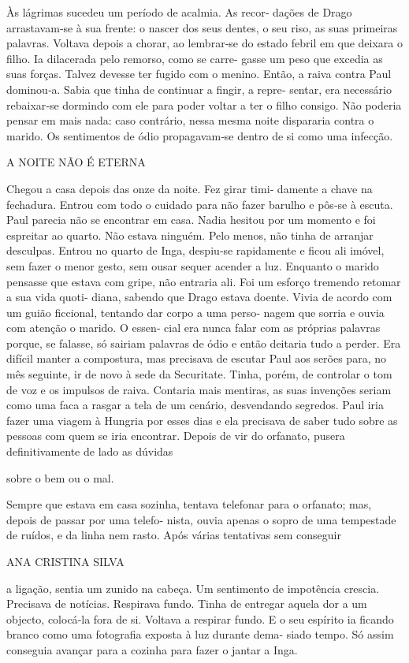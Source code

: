 Às lágrimas sucedeu um período de acalmia. As recor‑ dações de Drago
arrastavam‑se à sua frente: o nascer dos seus dentes, o seu riso, as
suas primeiras palavras. Voltava depois a chorar, ao lembrar‑se do
estado febril em que deixara o filho. Ia dilacerada pelo remorso, como
se carre‑ gasse um peso que excedia as suas forças. Talvez devesse ter
fugido com o menino. Então, a raiva contra Paul dominou‑a. Sabia que
tinha de continuar a fingir, a repre‑ sentar, era necessário rebaixar‑se
dormindo com ele para poder voltar a ter o filho consigo. Não poderia
pensar em mais nada: caso contrário, nessa mesma noite dispararia contra
o marido. Os sentimentos de ódio propagavam‑se dentro de si como uma
infecção.

A NOITE NÃO É ETERNA

Chegou a casa depois das onze da noite. Fez girar timi‑ damente a chave
na fechadura. Entrou com todo o cuidado para não fazer barulho e pôs‑se
à escuta. Paul parecia não se encontrar em casa. Nadia hesitou por um
momento e foi espreitar ao quarto. Não estava ninguém. Pelo menos, não
tinha de arranjar desculpas. Entrou no quarto de Inga, despiu‑se
rapidamente e ficou ali imóvel, sem fazer o menor gesto, sem ousar
sequer acender a luz. Enquanto o marido pensasse que estava com gripe,
não entraria ali. Foi um esforço tremendo retomar a sua vida quoti‑
diana, sabendo que Drago estava doente. Vivia de acordo com um guião
ficcional, tentando dar corpo a uma perso‑ nagem que sorria e ouvia com
atenção o marido. O essen‑ cial era nunca falar com as próprias palavras
porque, se falasse, só sairiam palavras de ódio e então deitaria tudo a
perder. Era difícil manter a compostura, mas precisava de escutar Paul
aos serões para, no mês seguinte, ir de novo à sede da Securitate.
Tinha, porém, de controlar o tom de voz e os impulsos de raiva. Contaria
mais mentiras, as suas invenções seriam como uma faca a rasgar a tela de
um cenário, desvendando segredos. Paul iria fazer uma viagem à Hungria
por esses dias e ela precisava de saber tudo sobre as pessoas com quem
se iria encontrar. Depois de vir do orfanato, pusera definitivamente de
lado as dúvidas

sobre o bem ou o mal.

Sempre que estava em casa sozinha, tentava telefonar para o orfanato;
mas, depois de passar por uma telefo‑ nista, ouvia apenas o sopro de uma
tempestade de ruídos, e da linha nem rasto. Após várias tentativas sem
conseguir

ANA CRISTINA SILVA

a ligação, sentia um zunido na cabeça. Um sentimento de impotência
crescia. Precisava de notícias. Respirava fundo. Tinha de entregar
aquela dor a um objecto, colocá‑la fora de si. Voltava a respirar fundo.
E o seu espírito ia ficando branco como uma fotografia exposta à luz
durante dema‑ siado tempo. Só assim conseguia avançar para a cozinha
para fazer o jantar a Inga.

